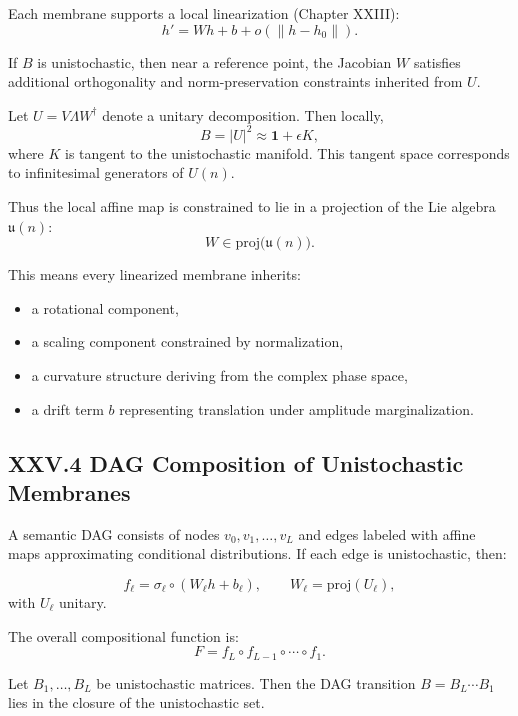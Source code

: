 \documentclass[12pt,letterpaper]{article}
\begin{document}
Each membrane supports a local linearization (Chapter XXIII):
\[
h' = W h + b + o(\|h - h_0\|).
\]

If $B$ is unistochastic, then near a reference point, the Jacobian $W$ satisfies additional orthogonality and norm-preservation constraints inherited from $U$.

Let $U = V \Lambda W^\dagger$ denote a unitary decomposition. Then locally,
\[
B = |U|^2 \approx \mathbf{1} + \epsilon K,
\]
where $K$ is tangent to the unistochastic manifold. This tangent space corresponds to infinitesimal generators of $U(n)$.

Thus the local affine map is constrained to lie in a projection of the Lie algebra $\mathfrak{u}(n)$:
\[
W \in \mathrm{proj}\big(\mathfrak{u}(n)\big).
\]

This means every linearized membrane inherits:

\begin{itemize}
    \item a rotational component,
    \item a scaling component constrained by normalization,
    \item a curvature structure deriving from the complex phase space,
    \item a drift term $b$ representing translation under amplitude marginalization.
\end{itemize}

\subsection{XXV.4 DAG Composition of Unistochastic Membranes}

A semantic DAG consists of nodes $v_0, v_1, \dots, v_L$ and edges labeled with affine maps approximating conditional distributions. If each edge is unistochastic, then:

\[
f_\ell = \sigma_\ell \circ (W_\ell h + b_\ell), \qquad
W_\ell = \mathrm{proj}(U_\ell),
\]
with $U_\ell$ unitary.

The overall compositional function is:
\[
F = f_L \circ f_{L-1} \circ \cdots \circ f_1.
\]

\begin{theorem}
Let $B_1, \dots, B_L$ be unistochastic matrices.  
Then the DAG transition $B = B_L \cdots B_1$ lies in the closure of the unistochastic set.
\end{theorem}
\end{document}
